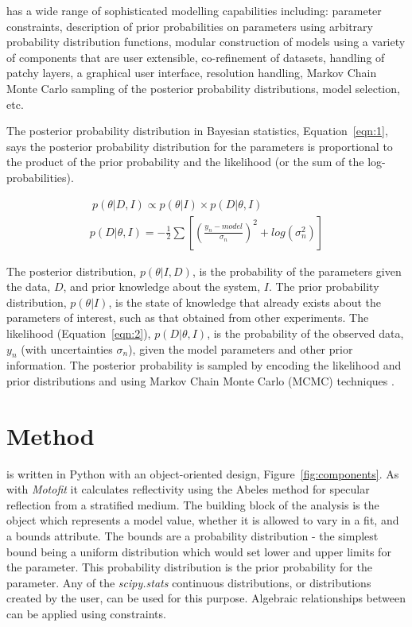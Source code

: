 \documentclass[12pt]{article}
\begin{document}
 has a wide range of sophisticated modelling capabilities including: parameter constraints, description of prior probabilities on parameters using arbitrary probability distribution functions, modular construction of models using a variety of components that are user extensible, co-refinement of datasets, handling of patchy layers, a graphical user interface, resolution handling, Markov Chain Monte Carlo sampling of the posterior probability distributions, model selection, etc.

The posterior probability distribution in Bayesian statistics, Equation~\ref{eqn:1}, says the posterior probability distribution for the parameters is proportional to the product of the prior probability and the likelihood (or the sum of the log-probabilities).

\begin{gather} 
\label{eqn:1}\ p(\theta | D, I) \propto p(\theta | I)\times p(D | \theta, I)\\
p(D | \theta, I) = -\frac{1}{2} \sum [(\frac{y_n - model} {\sigma_n})^2 + log(\sigma_n^2)]\label{eqn:2}
\end{gather}

The posterior distribution, $p(\theta | I, D)$, is the probability of the parameters given the data, $D$, and prior knowledge about the system, $I$. 
The prior probability distribution, $p(\theta | I)$, is the state of knowledge that already exists about the parameters of interest, such as that obtained from other experiments.
The likelihood (Equation~\ref{eqn:2}), $p(D | \theta, I)$, is the probability of the observed data, $y_n$ (with uncertainties $\sigma_n$), given the model parameters and other prior information.  The posterior probability is sampled by encoding the likelihood and prior distributions and using Markov Chain Monte Carlo (MCMC) techniques \cite{emcee}.

\section*{Method}
 is written in Python with an object-oriented design, Figure~\ref{fig:components}. As with \emph{Motofit} \cite{Nelson2006} it calculates reflectivity using the Abeles method \cite{Heavens1955} for specular reflection from a stratified medium.
The building block of the analysis is the \Parameter object which represents a model value, whether it is allowed to vary in a fit, and a bounds attribute. The bounds are a probability distribution - the simplest bound being a uniform distribution which would set lower and upper limits for the parameter. This probability distribution is the prior probability for the parameter. Any of the \emph{scipy.stats} \cite{Jones2001-2017} continuous distributions, or distributions created by the user, can be used for this purpose. Algebraic relationships between \Parameter can be applied using constraints.
\end{document}
